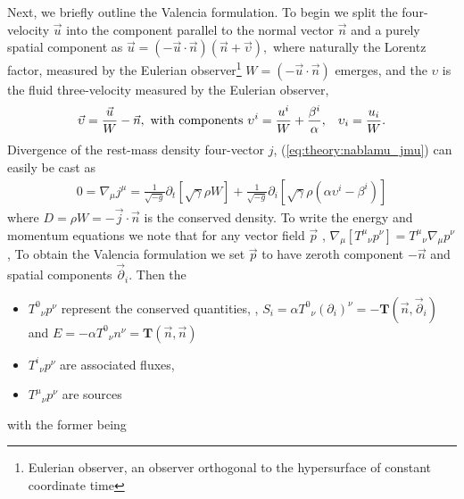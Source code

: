 Next, we briefly outline the Valencia formulation.
To begin we split the four-velocity $\vec{u}$ into the component parallel to the 
normal vector $\vec{n}$ and a purely spatial component as 
%
$\vec{u} = (-\vec{u} \cdot \vec{n})(\vec{n} + \vec{\upsilon}),$
%
where naturally the Lorentz factor, measured by the Eulerian observer\footnote{
    Eulerian observer, an observer orthogonal to the hypersurface of constant coordinate time} 
$W = (-\vec{u}\cdot\vec{n})$ emerges, 
and the $\upsilon$ is the fluid three-velocity measured by the Eulerian observer, 
%
\begin{equation}
\vec{\upsilon} = \frac{\vec{u}}{W} -\vec{n}, \text{ with components } \upsilon^i = \frac{u^i}{W}+ \frac{\beta^i}{\alpha}, \hspace{3mm} \upsilon_i= \frac{u_{i}}{W}.
\end{equation}
%
Divergence of the rest-mass density four-vector $j$, (\ref{eq:theory:nablamu_jmu}) can easily be cast as 
%
\begin{eqnarray}
0 = \nabla_{\mu}j^{\mu} = \frac{1}{\sqrt{-g}}\partial_{t}[\sqrt{\gamma}\rho W] + \frac{1}{\sqrt{-g}}\partial_{i}[\sqrt{\gamma}\rho(\alpha \upsilon^{i} - \beta^{i})]
\end{eqnarray}
%
where $D=\rho W = -\vec{j}\cdot \vec{n}$ is the conserved density.
%
To write the energy and momentum equations we note that for any vector field $\vec{p}$ \citep{Rezzolla:2013}, 
%
$\nabla_{\mu}[{T^{\mu}}_{\nu}p^{\nu}] = {T^{\mu}}_{\nu}\nabla_{\mu}p^{\nu}$,
%
To obtain the Valencia formulation we set $\vec{p}$ to have zeroth component $-\vec{n}$ 
and spatial components $\vec{\partial}_i$. Then the
%
\begin{itemize}
    \item ${T^0}_{\nu}p^{\nu}$ represent the conserved quantities, \ie, 
    $S_{i} = \alpha {T^0}_{\nu}(\partial_i)^{\nu}=-\boldsymbol{T}(\vec{n},\vec{\partial}_i)$ and 
    $E = -\alpha{T^0}_{\nu}n^{\nu} = \boldsymbol{T}(\vec{n},\vec{n})$
    \item ${T^i}_{\nu}p^{\nu}$ are associated fluxes,
    \item ${T^{\mu}}_{\nu}p^{\nu}$ are sources
\end{itemize}
%
with the former being 
%
